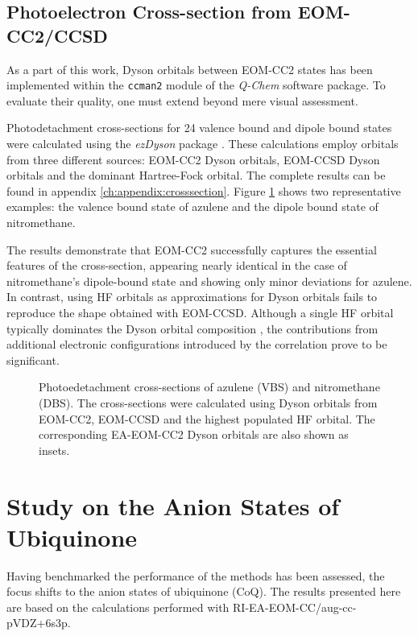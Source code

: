 \subsection{Photoelectron Cross-section from EOM-CC2/CCSD}

As a part of this work, Dyson orbitals between EOM-CC2 states has been implemented within the \texttt{ccman2} module of the \textit{Q-Chem} software package. To evaluate their quality, one must extend beyond mere visual assessment.

Photodetachment cross-sections for 24 valence bound and dipole bound states were calculated using the \textit{ezDyson} package \cite{gozem2022ezspectra,gozem2015photoionization}. These calculations employ orbitals from three different sources: EOM-CC2 Dyson orbitals, EOM-CCSD Dyson orbitals and the dominant Hartree-Fock orbital. The complete results can be found in appendix \ref{ch:appendix:crosssection}. Figure \ref{fig:ezDyson} shows two representative examples: the valence bound state of azulene and the dipole bound state of nitromethane.

The results demonstrate  that EOM-CC2 successfully captures the essential features of the cross-section, appearing nearly identical in the case of nitromethane's dipole-bound state and showing only minor deviations for azulene. In contrast, using HF orbitals as approximations for Dyson orbitals fails to reproduce the shape obtained with EOM-CCSD. Although a single HF orbital typically dominates the Dyson orbital composition \cite{diaz2019dyson}, the contributions from additional electronic configurations introduced by the correlation prove to be significant.

\begin{figure}[th!]
    \centering
    \small
    
    \caption[Photoedetachment Crossections.]{ Photoedetachment cross-sections of azulene (VBS) and nitromethane (DBS). The cross-sections were calculated using Dyson orbitals from EOM-CC2, EOM-CCSD and the highest populated HF orbital. The corresponding EA-EOM-CC2 Dyson orbitals are also shown as insets.}
    \label{fig:ezDyson}
\end{figure}

\section{Study on the Anion States of Ubiquinone}

Having benchmarked the performance of the methods has been assessed, the focus shifts to the anion states of ubiquinone (CoQ). The results presented here are based on the calculations performed with RI-EA-EOM-CC/aug-cc-pVDZ+6s3p.

